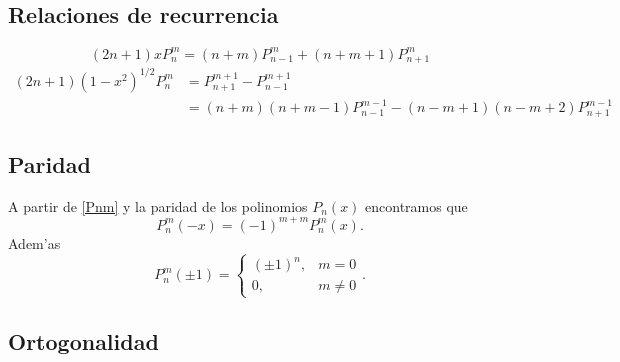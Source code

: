 \subsection{Relaciones de recurrencia}

\begin{equation}
(2n+1)xP_n^m=(n+m)P_{n-1}^m+(n+m+1)P_{n+1}^m
\end{equation}
\begin{align}
(2n+1)(1-x^2)^{1/2}P_n^m &= P_{n+1}^{m+1}-P_{n-1}^{m+1} \\
&= (n+m)(n+m-1)P_{n-1}^{m-1}-(n-m+1)(n-m+2)P_{n+1}^{m-1}
\end{align}

\subsection{Paridad}
A partir de \eqref{Pnm} y la paridad de los polinomios $P_n(x)$ encontramos que
\begin{equation}
P_n^m(-x)=(-1)^{m+m}P_n^m(x).
\end{equation}
Adem'as
\begin{equation}
P_n^m(\pm 1)=\left\{\begin{array}{cl}
(\pm 1)^n, & m=0\\
0, & m\neq 0
\end{array}\right..
\end{equation}
\subsection{Ortogonalidad}

